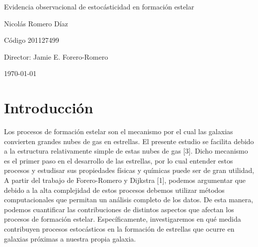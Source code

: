 \documentclass[12pt]{article}
\begin{document}
\begin{center}
\Huge
Evidencia observacional de estoc\'asticidad en formaci\'on estelar

\vspace{3mm}
\Large Nicol\'as Romero D\'iaz

\large
C\'odigo 201127499


\vspace{2mm}
\Large
Director: Jamie E. Forero-Romero

\normalsize
\vspace{2mm}

\today
\end{center}


\normalsize
\section{Introducci\'on}


Los procesos de formaci\'on estelar son el mecanismo por el cual las galaxias convierten grandes nubes de gas en estrellas. El presente estudio se facilita debido a la estructura relativamente simple de estas nubes de gas [3]. Dicho mecanismo es el primer paso en el desarrollo de las estrellas, por lo cual entender estos procesos  y estudisar sus propiedades f\'isicas y qu\'imicas puede ser de gran utilidad, \\

A partir del trabajo de Forero-Romero y Dijkstra [1], podemos argumentar que debido a la alta complejidad de estos procesos debemos utilizar m\'etodos computacionales que permitan un an\'alisis completo de los datos. De esta manera, podemos cuantificar las contribuciones de distintos aspectos que afectan los procesos de formaci\'on estelar. Espec\'ificamente, investigaremos en qu\'e medida contribuyen procesos estoc\'asticos en la formaci\'on de estrellas que ocurre en galaxias pr\'oximas a nuestra propia galaxia. \\
\end{document}
